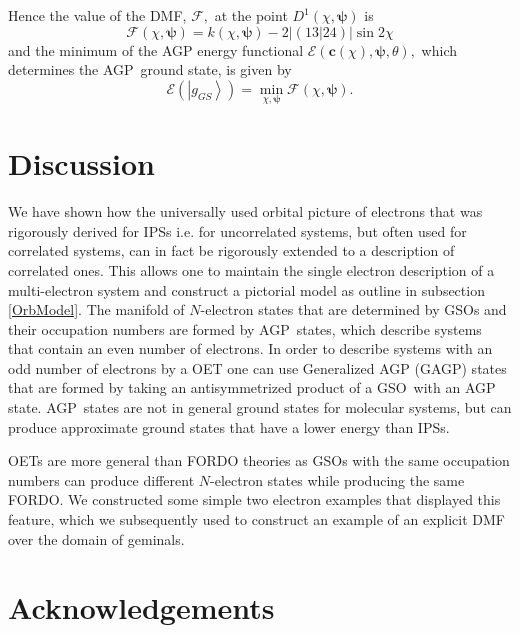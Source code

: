 \documentclass[aps,preprint]{revtex4}%
\begin{document}
Hence the value of the DMF, $\mathcal{F},$ at the point $D^{1}\left(
\chi,\boldsymbol{\psi}\right)  $ is%
\begin{equation}
\mathcal{F}\left(  \chi,\boldsymbol{\psi}\right)  =k\left(  \chi
,\boldsymbol{\psi}\right)  -2\left\vert \left(  \left.  13\right\vert
24\right)  \right\vert \sin2\chi
\end{equation}
and the minimum of the AGP energy functional $\mathcal{E}\left(
\boldsymbol{c}\left(  \chi\right)  ,\boldsymbol{\psi},\theta\right)  ,$ which
determines the AGP\ ground state, is given by
\begin{equation}
\mathcal{E}\left(  \left\vert g_{GS}\right\rangle \right)  =\min
_{\chi,\boldsymbol{\psi}}\mathcal{F}\left(  \chi,\boldsymbol{\psi}\right)  .
\end{equation}


\section{Discussion\label{Discussion}}

We have shown how the universally used orbital picture of electrons that was
rigorously derived for IPSs i.e. for uncorrelated systems, but often used for
correlated systems, can in fact be rigorously extended to a description of
correlated ones. This allows one to maintain the single electron description
of a multi-electron system and construct a pictorial model as outline in
subsection \ref{OrbModel}. The manifold of $N$-electron states that are
determined by GSOs and their occupation numbers are formed by AGP\ states,
which describe systems that contain an even number of electrons. In order to
describe systems with an odd number of electrons by a OET one can use
Generalized AGP (GAGP) states \cite{1966A03263} that are formed by taking an
antisymmetrized product of a GSO\ with an AGP state. AGP\ states are not in
general ground states for molecular systems, but can produce approximate
ground states that have a lower energy than IPSs.

OETs are more general than FORDO theories as GSOs with the same occupation
numbers can produce different $N$-electron states while producing the same
FORDO. We constructed some simple two electron examples that displayed this
feature, which we subsequently used to construct an example of an explicit DMF
over the domain of geminals.

\section{Acknowledgements}
\end{document}

